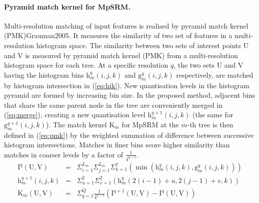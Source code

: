 \paragraph{Pyramid match kernel for MpSRM.}
Multi-resolution matching of input features is realised by pyramid match kernel (PMK){Grauman2005}. It measures the similarity of two set of features in a multi-resolution histogram space.
The similarity between two sets of interest points $\mathrm{U}$ and $\mathrm{V}$ is measured by pyramid match kernel (PMK) from a multi-resolution histogram space for each tree. At a specific resolution $q$, the two sets $\mathrm{U}$ and $\mathrm{V}$ having the histogram bins $\mathrm{h}^q_{m}(i,j,k)$ and $\mathrm{g}^q_{m}(i,j,k)$ respectively, are matched by histogram intersection in (\ref{eq:hik}). New quantisation levels in the histogram pyramid are formed by increasing bin size. In the proposed method, adjacent bins that share the same parent node in the tree are conveniently merged in (\ref{eq:merge}), creating a new quantisation level $\mathrm{h}^{q+1}_m(i,j,k)$ (the same for $\mathrm{g}^{q+1}_m(i,j,k)$). The match kernel $\mathrm{K}_m$ for MpSRM at the $m$-th tree is then defined in (\ref{eq:pmk}) by the weighted summation of difference between successive histogram intersections. Matches in finer bins score higher similarity than matches in coarser levels by a factor of $\frac{1}{4^{q-1}}$.
\begin{eqnarray}
\label{eq:hik}
\mathrm{I}^q(\mathrm{U},\mathrm{V}) &= & \Sigma_{i=1}^{L_m}\Sigma_{j=1}^{L_m}\Sigma_{k=1}^{7} \left( \min(\mathrm{h}^{q}_m(i,j,k), \mathrm{g}^{q}_m(i,j,k)) \right)\\
\label{eq:merge}
\mathrm{h}^{q+1}_m(i,j,k) &= &\Sigma_{u=1}^{2}\Sigma_{v=1}^{2} \left( \mathrm{h}^{q}_m(2(i-1)+u,2(j-1)+v,k) \right)\\
\label{eq:pmk}
\mathrm{K}_m(\mathrm{U},\mathrm{V}) &= & \Sigma_{q = 1}^{Q}\frac{1}{4^{q-1}} \left( \mathrm{I}^{q+1}(\mathrm{U},\mathrm{V}) - \mathrm{I}^{q}(\mathrm{U},\mathrm{V}) \right)
\end{eqnarray}

